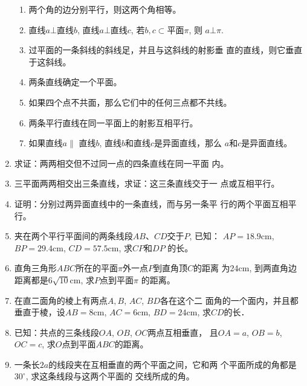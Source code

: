 \begin{enumerate}
\begin{enumerate}[(1)]
\item 两个角的边分别平行，则这两个角相等。
\item 直线$a\bot $直线$b$, 直线$a\bot $直线$c$, 若$b,c\subset $平面$\pi$, 则
$a\bot \pi$.
\item 过平面的一条斜线的斜线足，并且与这斜线的射影垂
直的直线，则它垂直于这斜线。
\item 两条直线确定一个平面。
\item 如果四个点不共面，那么它们中的任何三点都不共线。
\item 两条平行直线在同一平面上的射影互相平行。
\item 如果直线$a\parallel$ 直线$b$, 直线$b$和直线$c$是异面直线，那么
$a$和$c$是异面直线。
\end{enumerate}

\item 求证：两两相交但不过同一点的四条直线在同一平面
内。
\item 三平面两两相交出三条直线，求证：这三条直线交于一
点或互相平行。
\item 证明：分别过两异面直线中的一条直线，而与另一条平
行的两个平面互相平行。
\item 夹在两个平行平面间的两条线段$AB$、$CD$交于$P$, 已知：
$AP=18.9$cm, $BP=29.4$cm, $CD=57.5$cm, 求$CP$和$DP$
的长。
\item 直角三角形$ABC$所在的平面$\pi$外一点$P$到直角顶$C$的距离
为24cm, 到两直角边距离都是$6\sqrt{10}$cm, 求$P$点到平面$\pi$
的距离。
\item 在直二面角的棱上有两点$A,B$, $AC$, $BD$各在这个二
面角的一个面内，并且都垂直于棱，设$AB=8$cm, $AC
=6$cm, $BD=24$cm, 求$CD$的长．
\item 已知：共点的三条线段$OA$, $OB$, $OC$两点互相垂直，
且$OA=a$, $OB=b$, $OC=c$, 求$O$点到平面$ABC$的距离。
\item 一条长$2a$的线段夹在互相垂直的两个平面之间，它和两
个平面所成的角都是$30^{\circ}$, 求这条线段与这两个平面的
交线所成的角。




















\end{enumerate}